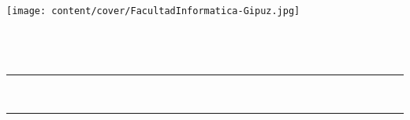 \thispagestyle{empty}

\newcommand{\HRule}{\rule{\linewidth}{0.5mm}}

\thispagestyle{empty}
\begin{center}

    \texttt{[image: content/cover/FacultadInformatica-Gipuz.jpg]} \\[2cm]


    {\LARGE {\gapizenburua}}\\[0.5cm]
    {\Large \ikasketak}\\[0.25cm]
    {\espezialitatea}\\[2cm]


    \HRule \\[0.5cm]
    {\LARGE
    \textbf{\izenburua}
    }
    \HRule \\[0.5cm]

    \Large \textsl{\egilea}\\


    \vfill

    \textbf{\zuzendariaktestua}\\
    \zuzendariak\\[2cm]

    \data

\end{center}
